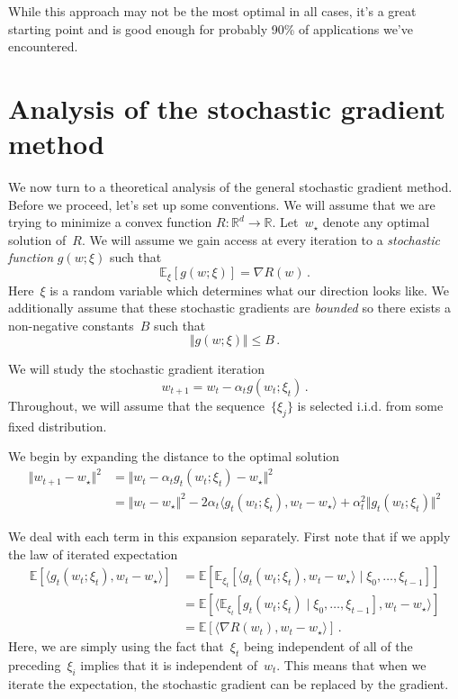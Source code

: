 \documentclass{tufte-book}
\begin{document}
While this approach may not be the most optimal in all cases, it's a
great starting point and is good enough for probably 90\% of
applications we've encountered.

\hypertarget{analysis-of-the-stochastic-gradient-method}{%
\section{Analysis of the stochastic gradient
method}\label{analysis-of-the-stochastic-gradient-method}}

We now turn to a theoretical analysis of the general stochastic gradient
method. Before we proceed, let's set up some conventions. We will assume
that we are trying to minimize a convex function
\(R:\mathbb{R}^d \rightarrow \mathbb{R}\). Let~\(w_\star\) denote any
optimal solution of~\(R\). We will assume we gain access at every
iteration to a \emph{stochastic function} \(g(w;\xi)\) such that \[
    \mathbb{E}_\xi[g(w; \xi)] = \nabla R(w)\,.
\] Here~\(\xi\) is a random variable which determines what our direction
looks like. We additionally assume that these stochastic gradients are
\emph{bounded} so there exists a non-negative constants~\(B\) such that
\[
     \Vert g(w;\xi)\Vert \leq  B\,.
\]

We will study the stochastic gradient iteration \[
w_{t+1}=w_{t}-\alpha_{t}g\left(w_{t};\xi_t\right)\,.
\] Throughout, we will assume that the sequence~\(\{\xi_j\}\) is
selected i.i.d. from some fixed distribution.

We begin by expanding the distance to the optimal solution \[
\begin{aligned}
 \Vert w_{t+1} - w_\star \Vert^2 &=
 \Vert  w_t - \alpha_t g_t(w_t;\xi_t) - w_\star \Vert^2  \\
 &= \Vert w_t - w_\star\Vert^2 -2 \alpha_t \langle g_t( w_t;\xi_t), w_t- w_\star \rangle + \alpha_t^2 \Vert g_t(w_t; \xi_t) \Vert^2
\end{aligned}
\]

We deal with each term in this expansion separately. First note that if
we apply the law of iterated expectation \[
\begin{aligned}
    \mathbb{E}[ \langle g_t(w_t;\xi_t), w_t - w_\star \rangle ]
    &= \mathbb{E}\left[\mathbb{E}_{\xi_t}[  \langle g_t(w_t;\xi_t), w_t - w_\star \rangle \mid  \xi_0,\ldots,\xi_{t-1} ]\right]\\
    &= \mathbb{E}\left[  \langle\mathbb{E}_{\xi_t}[  g_t(w_t;\xi_t)  \mid  \xi_0,\ldots,\xi_{t-1} ] , w_t - w_\star \rangle\right]\\
    &= \mathbb{E}\left[ \langle \nabla R(w_t) , w_t - w_\star \rangle\right]\,.
\end{aligned}
\] Here, we are simply using the fact that~\(\xi_t\) being independent
of all of the preceding~\(\xi_i\) implies that it is independent
of~\(w_t\). This means that when we iterate the expectation, the
stochastic gradient can be replaced by the gradient.
\end{document}
